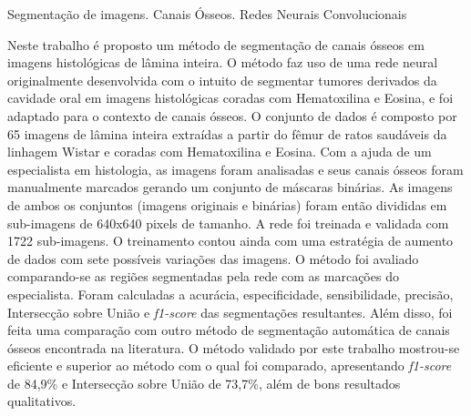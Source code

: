\documentclass[dissertmst]{ppgco}
\begin{document}


\begin{resumo}{Segmentação de imagens. Canais Ósseos. Redes Neurais Convolucionais}

Neste trabalho é proposto um método de segmentação de canais ósseos em imagens histológicas de lâmina inteira. O método faz uso de uma rede neural originalmente desenvolvida com o intuito de segmentar tumores derivados da cavidade oral em imagens histológicas coradas com Hematoxilina e Eosina, e foi adaptado para o contexto de canais ósseos. O conjunto de dados é composto por 65 imagens de lâmina inteira extraídas a partir do fêmur de ratos saudáveis da linhagem Wistar e coradas com Hematoxilina e Eosina.
Com a ajuda de um especialista em histologia, as imagens foram analisadas e seus canais ósseos foram manualmente marcados gerando um conjunto de máscaras binárias. As imagens de ambos os conjuntos (imagens originais e binárias) foram então divididas em sub-imagens de 640x640 pixels de tamanho. A rede foi treinada e validada com 1722 sub-imagens. O treinamento contou ainda com uma estratégia de aumento de dados com sete possíveis variações das imagens. O método foi avaliado comparando-se as regiões segmentadas pela rede com as marcações do especialista. Foram calculadas a acurácia, especificidade, sensibilidade, precisão, Intersecção sobre União e \textit{f1-score} das segmentações resultantes. Além disso, foi feita uma comparação com outro método de segmentação automática de canais ósseos encontrada na literatura. O método validado por este trabalho mostrou-se eficiente e superior ao método com o qual foi comparado, apresentando \textit{f1-score} de 84,9\% e Intersecção sobre União de 73,7\%, além de bons resultados qualitativos.

\end{resumo}
\end{document}
